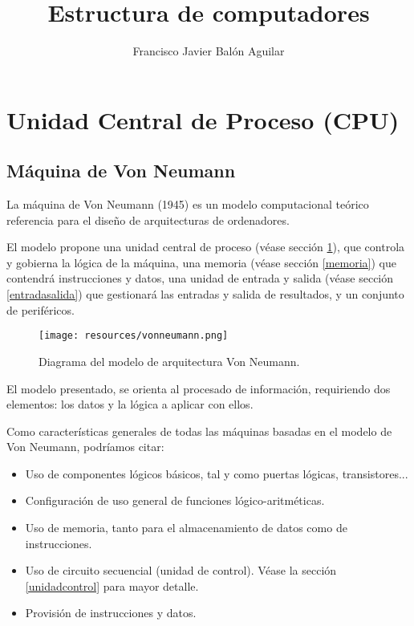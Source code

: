 \documentclass[a4paper, 11pt, titlepage]{article}
\title{Estructura de computadores}
\author{Francisco Javier Balón Aguilar}
\begin{document}
\maketitle
\renewcommand{\contentsname}{Índice}
\tableofcontents
\newpage

\section{Unidad Central de Proceso (CPU)}\label{cpu}

    \subsection{Máquina de Von Neumann}

        La máquina de Von Neumann (1945) es un modelo computacional teórico referencia para 
        el diseño de arquitecturas de ordenadores.

        El modelo propone una unidad central de proceso (véase sección \ref{cpu}), que controla y gobierna la lógica 
        de la máquina, una memoria (véase sección \ref{memoria}) que contendrá instrucciones y datos, una unidad de entrada
        y salida (véase sección \ref{entradasalida}) que gestionará las entradas y salida de resultados, y un conjunto de periféricos.

        \begin{figure}[htp]
            \centering
            \texttt{[image: resources/vonneumann.png]}
            \caption{Diagrama del modelo de arquitectura Von Neumann.}
            \label{vonneumann}
        \end{figure}

        El modelo presentado, se orienta al
        procesado de información, requiriendo dos elementos: los datos y la lógica a aplicar 
        con ellos.

        Como características generales de todas las máquinas basadas en el modelo de Von Neumann, 
        podríamos citar:

        \begin{itemize}
            \item Uso de componentes lógicos básicos, tal y como puertas lógicas, transistores... 
            \item Configuración de uso general de funciones lógico-aritméticas.
            \item Uso de memoria, tanto para el almacenamiento de datos como de instrucciones.
            \item Uso de circuito secuencial (unidad de control). Véase la sección \ref{unidadcontrol} 
            para mayor detalle.
            \item Provisión de instrucciones y datos.
        \end{itemize}
\end{document}
